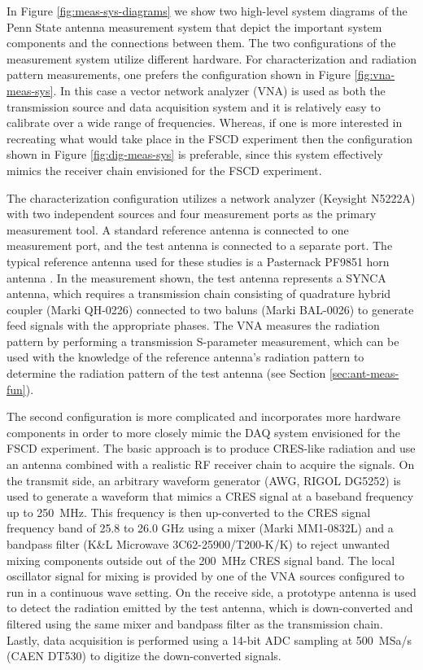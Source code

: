 In Figure \ref{fig:meas-sys-diagrams} we show two high-level system diagrams of the Penn State antenna measurement system that depict the important system components and the connections between them. The two configurations of the measurement system utilize different hardware. For characterization and radiation pattern measurements, one prefers the configuration shown in Figure \ref{fig:vna-meas-sys}. In this case a vector network analyzer (VNA) is used as both the transmission source and data acquisition system and it is relatively easy to calibrate over a wide range of frequencies. Whereas, if one is more interested in recreating what would take place in the FSCD experiment then the configuration shown in Figure \ref{fig:dig-meas-sys} is preferable, since this system effectively mimics the receiver chain envisioned for the FSCD experiment. 

The characterization configuration utilizes a network analyzer (Keysight N5222A) \cite{vna, keysight_vna} with two independent sources and four measurement ports as the primary measurement tool. A standard reference antenna is connected to one measurement port, and the test antenna is connected to a separate port. The typical reference antenna used for these studies is a Pasternack PF9851 horn antenna \cite{pasternack_antenna}. In the measurement shown, the test antenna represents a SYNCA antenna, which requires a transmission chain consisting of quadrature hybrid coupler \cite{marki, quad} (Marki QH-0226) connected to two baluns \cite{balun} (Marki BAL-0026) to generate feed signals with the appropriate phases. The VNA measures the radiation pattern by performing a transmission S-parameter measurement, which can be used with the knowledge of the reference antenna's radiation pattern to determine the radiation pattern of the test antenna (see Section \ref{sec:ant-meas-fun}).

The second configuration is more complicated and incorporates more hardware components in order to more closely mimic the DAQ system envisioned for the FSCD experiment. The basic approach is to produce CRES-like radiation and use an antenna combined with a realistic RF receiver chain to acquire the signals. On the transmit side, an arbitrary waveform generator  \cite{awg} (AWG, RIGOL DG5252) is used to generate a waveform that mimics a CRES signal at a baseband frequency up to 250~MHz. This frequency is then up-converted to the CRES signal frequency band of 25.8 to 26.0 GHz using a mixer \cite{mixer} (Marki MM1-0832L) and a bandpass filter (K\&L Microwave 3C62-25900/T200-K/K) to reject unwanted mixing components outside out of the 200~MHz CRES signal band. The local oscillator signal for mixing is provided by one of the VNA sources configured to run in a continuous wave setting. On the receive side, a prototype antenna is used to detect the radiation emitted by the test antenna, which is down-converted and filtered using the same mixer and bandpass filter as the transmission chain. Lastly, data acquisition is performed using a 14-bit ADC sampling at 500~MSa/s \cite{caen} (CAEN DT530) to digitize the down-converted signals.

